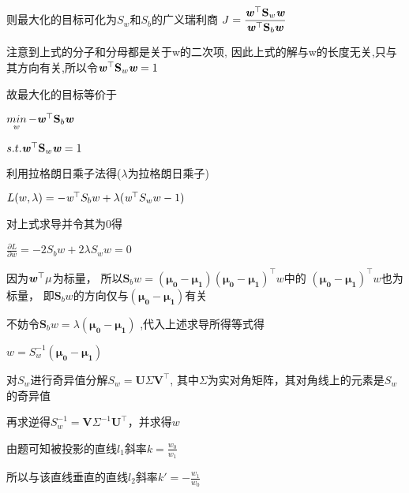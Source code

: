 \documentclass[UTF8]{ctexart}
\begin{document}
则最大化的目标可化为$S_w$和$S_b$的广义瑞利商
$\displaystyle{J=\frac{\mathbf{\textbf {\emph{w}}}^\top
            \textbf{S}_w \textbf{\emph{w}}}
        {\mathbf{\textbf {\emph{w}}}^\top
            \textbf{S}_b \textbf{\emph{w}}}}$

注意到上式的分子和分母都是关于w的二次项,
因此上式的解与w的长度无关,只与其方向有关,所以令$\mathbf{\textbf {\emph{w}}}^\top
    \textbf{S}_w \textbf{\emph{w}}=1$

故最大化的目标等价于

\begin{center}
    $\mathop{min}\limits_{w} -\mathbf{\textbf {\emph{w}}}^\top
        \textbf{S}_b \textbf{\emph{w}}$

    $s.t. \mathbf{\textbf {\emph{w}}}^\top
        \textbf{S}_w \textbf{\emph{w}}=1$
\end{center}

利用拉格朗日乘子法得($\lambda$为拉格朗日乘子)

\begin{center}
    $L(w,\lambda )=-\mathbf{\emph{w}}^\top S_b w
        +\lambda (\mathbf{\emph{w}}^\top S_w w -1)$
\end{center}

对上式求导并令其为0得

\begin{center}
    $\displaystyle{\frac{\partial L}{\partial w}=-2S_bw+2\lambda S_w w=0}$
\end{center}

因为$\mathbf{\textbf {\emph{w}}}^\top \mu$为标量，
所以$\textbf{S}_b w=\mathbf{(\mu_0-\mu_1 )(\mu_0-\mu_1 )}^\top w$中的
$\mathbf{(\mu_0-\mu_1 )}^\top w$也为标量，
即$\textbf{S}_b w$的方向仅与$\mathbf{(\mu_0-\mu_1 )}$有关

不妨令$\textbf{S}_b w=\lambda \mathbf{(\mu_0-\mu_1 )}$
,代入上述求导所得等式得

\begin{center}
    $ w=S_w^{-1}\mathbf{(\mu_0-\mu_1 )}$
\end{center}

对$S_w$进行奇异值分解$S_w=\mathbf{U}\Sigma \mathbf{V}^\top$,
其中$\Sigma$为实对角矩阵，其对角线上的元素是$S_w$的奇异值

再求逆得$S_w^{-1}=\mathbf{V}\Sigma ^{-1}\mathbf{U}^\top$，并求得$w$


由题可知被投影的直线$l_1$斜率$\displaystyle{k=\frac{w_0}{w_1}}$

所以与该直线垂直的直线$l_2$斜率$\displaystyle{k'=-\frac{w_1}{w_0}}$
\end{document}
